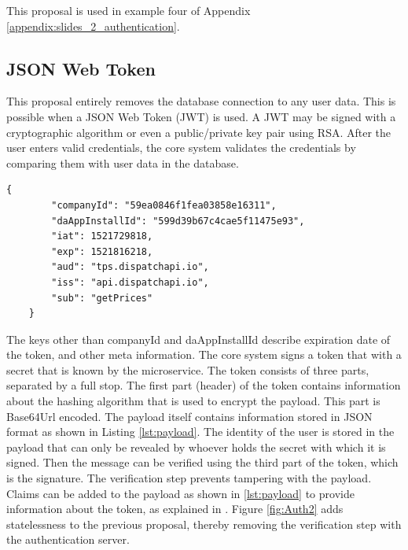 This proposal is used in example four of Appendix \ref{appendix:slides_2_authentication}.

\subsection{JSON Web Token}
This proposal entirely removes the database connection to any user data. This is possible when a JSON Web Token (JWT) is used. A JWT may be signed with a cryptographic algorithm or even a public/private key pair using RSA. After the user enters valid credentials, the core system validates the credentials by comparing them with user data in the database.

\begin{center}
\noindent\begin{minipage}{.85\textwidth}
\begin{lstlisting}[caption={Two user identifiers and registered claim names stored inside the payload of a JSON web token.}, label={lst:payload}]
	{
		"companyId": "59ea0846f1fea03858e16311",
		"daAppInstallId": "599d39b67c4cae5f11475e93",
		"iat": 1521729818,
		"exp": 1521816218,
		"aud": "tps.dispatchapi.io",
		"iss": "api.dispatchapi.io",
		"sub": "getPrices"
	}
\end{lstlisting}
\end{minipage}
\end{center}

The keys other than companyId and daAppInstallId describe expiration date of the token, and other meta information. The core system signs a token that with a secret that is known by the microservice. The token consists of three parts, separated by a full stop. The first part (header) of the token contains information about the hashing algorithm that is used to encrypt the payload. This part is Base64Url encoded. The payload itself contains information stored in JSON format as shown in Listing \ref{lst:payload}. The identity of the user is stored in the payload that can only be revealed by whoever holds the secret with which it is signed. Then the message can be verified using the third part of the token, which is the signature. The verification step prevents tampering with the payload. Claims can be added to the payload as shown in \ref{lst:payload} to provide information about the token, as explained in \cite{JWT}. Figure \ref{fig:Auth2} adds statelessness to the previous proposal, thereby removing the verification step with the authentication server.

